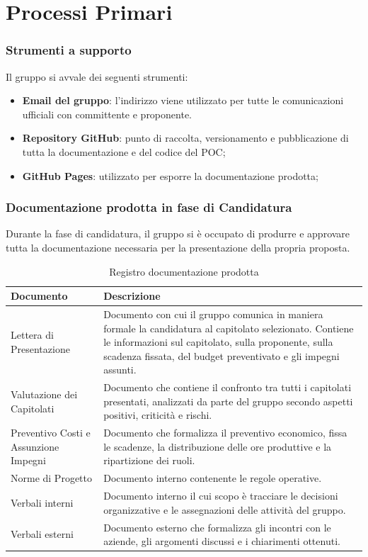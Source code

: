 \section{Processi Primari}
\subsubsection{Strumenti a supporto}
Il gruppo si avvale dei seguenti strumenti:
\begin{itemize}
	\item \textbf{Email del gruppo}: l'indirizzo {\emailgruppo} viene utilizzato per tutte le comunicazioni ufficiali con committente e proponente.
	\item \textbf{Repository GitHub}: punto di raccolta, versionamento e pubblicazione di tutta la documentazione e del codice del POC;
	\item \textbf{GitHub Pages}: utilizzato per esporre la documentazione prodotta;
\end{itemize}

\subsubsection{Documentazione prodotta in fase di Candidatura}
Durante la fase di candidatura, il gruppo si è occupato di produrre e approvare tutta la documentazione necessaria per la presentazione della propria proposta.

\begin{table}[htbp]
	\centering
	\caption{Registro documentazione prodotta}
	\label{tab:documenti}
	\renewcommand{\arraystretch}{1.3}
	\small
	\begin{tabularx}{\textwidth}{|>{\centering\arraybackslash}p{4.5cm}
			|X|}
		\hline
		\rowcolor[gray]{0.88}
		\textbf{Documento} &
		\centering\arraybackslash\textbf{Descrizione} \\
		\hline
		Lettera di Presentazione & Documento con cui il gruppo comunica in maniera formale la candidatura al capitolato selezionato. Contiene le informazioni sul capitolato, sulla proponente, sulla scadenza fissata, del budget preventivato e gli impegni assunti. \\ \hline
		Valutazione dei Capitolati & Documento che contiene il confronto tra tutti i capitolati presentati, analizzati da parte del gruppo secondo aspetti positivi, criticità e rischi. \\ \hline
		Preventivo Costi e Assunzione Impegni & Documento che formalizza il preventivo economico, fissa le scadenze, la distribuzione delle ore produttive e la ripartizione dei ruoli.  \\ \hline
		Norme di Progetto & Documento interno contenente le regole operative. \\ \hline
		Verbali interni & Documento interno il cui scopo è tracciare le decisioni organizzative e le assegnazioni delle attività del gruppo. \\ \hline
		Verbali esterni & Documento esterno che formalizza gli incontri con le aziende, gli argomenti discussi e i chiarimenti ottenuti. \\ \hline
	\end{tabularx}
\end{table}


